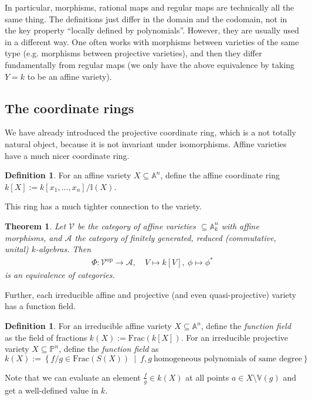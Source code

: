 \documentclass{scrartcl}
\newcommand{\I}{\mathbb{I}}
\newcommand{\V}{\mathbb{V}}
\newcommand{\Aff}{\mathbb{A}}
\newcommand{\Proj}{\mathbb{P}}
\newtheorem{theorem}[prop]{Theorem}
\theoremstyle{definition}
\newtheorem{definition}[prop]{Definition}
\begin{document}
In particular, morphisms, rational maps and regular maps are technically all the same thing.
The definitions just differ in the domain and the codomain, not in the key property ``locally defined by polynomials''.
However, they are usually used in a different way.
One often works with morphisms between varieties of the same type (e.g. morphisms between projective varieties), and then they differ fundamentally from regular maps (we only have the above equivalence by taking $Y = k$ to be an affine variety).

\subsection{The coordinate rings}
We have already introduced the projective coordinate ring, which is a not totally natural object, because it is not invariant under isomorphisms.
Affine varieties have a much nicer coordinate ring.
\begin{definition}
    For an affine variety $X \subseteq \Aff^n$, define the affine coordinate ring $k[X] := k[x_1, ..., x_n] / \I(X)$.
\end{definition}
This ring has a much tighter connection to the variety.
\begin{theorem}
    \label{prop:equivalence_of_categories}
    Let $\mathcal{V}$ be the category of affine varieties $\subseteq \Aff_k^n$ with affine morphisms, and $\mathcal{A}$ the category of finitely generated, reduced (commutative, unital) $k$-algebras.
    Then
    \begin{align*}
        \Phi: \mathcal{V}^{\mathrm{op}} \to \mathcal{A}, \quad V \mapsto k[V], \ \phi \mapsto \phi^*
    \end{align*}
    is an equivalence of categories.
\end{theorem}
Further, each irreducible affine and projective (and even quasi-projective) variety has a function field.
\begin{definition}
    For an irreducible affine variety $X \subseteq \Aff^n$, define the \emph{function field} as the field of fractions $k(X) := \mathrm{Frac}(k[X])$.
    For an irreducible projective variety $X \subseteq \Proj^n$, define the \emph{function field} as
    \begin{equation*}
        k(X) := \left\{ f/g \in \mathrm{Frac}(S(X)) \ \middle| \ f, g \ \text{homogeneous polynomials of same degree} \right\}
    \end{equation*}
\end{definition}
Note that we can evaluate an element $\frac f g \in k(X)$ at all points $a \in X \setminus \V(g)$ and get a well-defined value in $k$.
\end{document}
